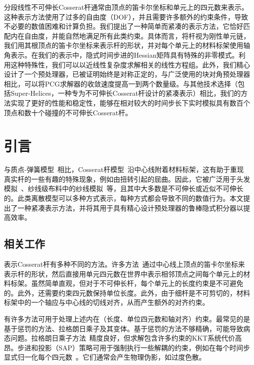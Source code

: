 分段线性不可伸长Cosserat杆通常由顶点的笛卡尔坐标和单元上的四元数来表示。这种表示方法使用了过多的自由度（DOF），并且需要许多额外的约束条件，导致不必要的数值困难和计算负担。我们提出了一种简单而紧凑的表示方法，它恰好匹配内在自由度，并能自然地满足所有此类约束。具体而言，将杆视为刚性单元链，我们用其根顶点的笛卡尔坐标来表示杆的形状，并对每个单元上的材料标架使用轴角表示。在我们的表示中，隐式时间步进的Hessian矩阵具有特殊的非零模式。利用这种特殊性，我们可以以近线性复杂度求解相关的线性方程组。此外，我们精心设计了一个预处理器，已被证明始终是对称正定的，与广泛使用的块对角预处理器相比，可以将PCG求解器的收敛速度提高一到两个数量级。与其他技术选择（包括Super-Helices，一种专为不可伸长Cosserat杆设计的紧凑表示）相比，我们的方法实现了更好的性能和稳定性，能够在相对较大的时间步长下实时模拟具有数百个顶点和数十个碰撞的不可伸长Cosserat杆。

\section{引言}

与质点-弹簧模型~\cite{selle2008mass}相比，Cosserat杆模型~\cite{pai2002strands,spillmann_corde_2007,spillmann2008cosseratnet}沿中心线附着材料标架，这有助于重现真实杆的一些有趣的特殊现象，例如由扭转引起的屈曲。因此，它被广泛用于头发模拟~\cite{kaufman_adaptive_2014}、纱线级布料中的纱线模拟~\cite{kaldor2008simulating}等，且其中大多数是不可伸长或近似不可伸长的。此类离散模型可以多种方式表示，每种方式都会导致不同的数值行为。本文提出了一种紧凑表示方法，并将其用于具有精心设计预处理器的鲁棒隐式积分器以提高效率。

\subsection{相关工作}

表示Cosserat杆有多种不同的方法。许多方法~\cite{spillmann_corde_2007,spillmann2008cosseratnet,wen_cosserat_2020}通过中心线上顶点的笛卡尔坐标来表示杆的形状，然后直接用单元四元数在世界中表示相邻顶点之间每个单元上的材料标架。虽然简单直观，但对于不可伸长杆，每个单元上的长度约束是不可避免的。此外，还需要约束四元数保持单位长度。此外，由于细杆是不可剪切的，材料标架中的一个轴应与中心线的切线对齐，从而产生额外的对齐约束。

有许多方法可用于处理上述内在（长度、单位四元数和轴对齐）约束。最常见的是基于惩罚的方法、拉格朗日乘子及其变体。基于惩罚的方法不够精确，可能导致病态问题。拉格朗日乘子方法~\cite{goldenthal_efficient_2007,spillmann_inextensible_2010,deul_direct_2018}精度良好，但求解包含许多约束的KKT系统代价高昂。步进和投影（SAP）策略可用于强制执行一些解耦的约束，例如在每个时间步显式归一化每个四元数~\cite{spillmann_corde_2007}。它们通常会产生物理伪影，如过度色散。

